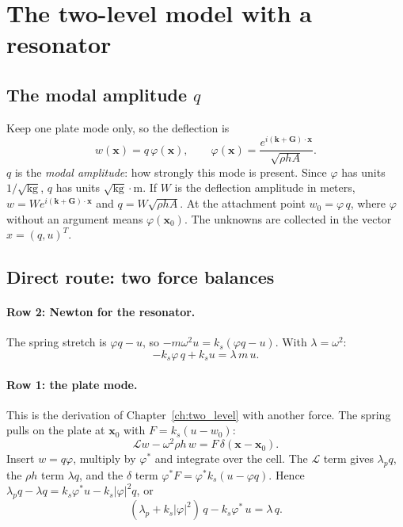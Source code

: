 \section{The two-level model with a resonator}

\subsection{The modal amplitude $q$}
Keep one plate mode only, so the deflection is
\begin{equation}
  w(\mathbf{x}) = q\,\varphi(\mathbf{x}),
  \qquad
  \varphi(\mathbf{x}) = \frac{e^{i(\mathbf{k}+\mathbf{G})\cdot\mathbf{x}}}{\sqrt{\rho h A}} .
\end{equation}
$q$ is the \emph{modal amplitude}: how strongly this mode is present. Since
$\varphi$ has units $1/\sqrt{\mathrm{kg}}$, $q$ has units
$\sqrt{\mathrm{kg}}\cdot\mathrm{m}$. If $W$ is the deflection amplitude in
meters, $w = W e^{i(\mathbf{k}+\mathbf{G})\cdot\mathbf{x}}$ and
$q = W\sqrt{\rho h A}$. At the attachment point $w_0 = \varphi\, q$, where
$\varphi$ without an argument means $\varphi(\mathbf{x}_0)$. The unknowns are
collected in the vector $x = (q, u)^T$.

\subsection{Direct route: two force balances}

\paragraph{Row 2: Newton for the resonator.}
The spring stretch is $\varphi q - u$, so $-m\omega^2 u = k_s(\varphi q - u)$.
With $\lambda = \omega^2$:
\begin{equation}
  -k_s\varphi\, q + k_s u = \lambda\, m\, u .
  \label{eq:row_resonator}
\end{equation}

\paragraph{Row 1: the plate mode.}
This is the derivation of Chapter~\ref{ch:two_level} with another force. The
spring pulls on the plate at $\mathbf{x}_0$ with $F = k_s(u - w_0)$:
\begin{equation}
  \mathcal{L} w - \omega^2 \rho h\, w = F\,\delta(\mathbf{x} - \mathbf{x}_0) .
\end{equation}
Insert $w = q\varphi$, multiply by $\varphi^*$ and integrate over the cell. The
$\mathcal{L}$ term gives $\lambda_p q$, the $\rho h$ term $\lambda q$, and the
$\delta$ term $\varphi^* F = \varphi^* k_s(u - \varphi q)$. Hence
$\lambda_p q - \lambda q = k_s\varphi^* u - k_s|\varphi|^2 q$, or
\begin{equation}
  (\lambda_p + k_s|\varphi|^2)\, q - k_s\varphi^*\, u = \lambda\, q .
  \label{eq:row_plate}
\end{equation}

